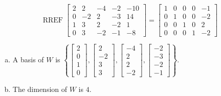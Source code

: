 \begin{exerciseAnswer} 


\[\operatorname{RREF} \left[\begin{array}{ccccc}
2 & 2 & -4 & -2 & -10 \\
0 & -2 & 2 & -3 & 14 \\
1 & 3 & 2 & -2 & 1 \\
0 & 3 & -2 & -1 & -8
\end{array}\right] = \left[\begin{array}{ccccc}
1 & 0 & 0 & 0 & -1 \\
0 & 1 & 0 & 0 & -2 \\
0 & 0 & 1 & 0 & 2 \\
0 & 0 & 0 & 1 & -2
\end{array}\right] \]


\begin{enumerate}[(a)]
\item A basis of \(W\) is \( \left\{ \left[\begin{array}{c}
2 \\
0 \\
1 \\
0
\end{array}\right] , \left[\begin{array}{c}
2 \\
-2 \\
3 \\
3
\end{array}\right] , \left[\begin{array}{c}
-4 \\
2 \\
2 \\
-2
\end{array}\right] , \left[\begin{array}{c}
-2 \\
-3 \\
-2 \\
-1
\end{array}\right] \right\} \).
\item The dimension of \(W\) is \( 4 \).
\end{enumerate}
    
\end{exerciseAnswer}
    
